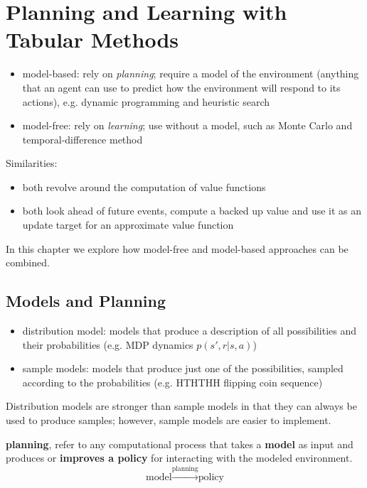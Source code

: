 \documentclass[sutton_barto_notes.tex]{subfiles}
\begin{document}
\newpage
\section{Planning and Learning with Tabular Methods}

\begin{itemize}
\item model-based: rely on \textit{planning}; require a model of the environment (anything that an agent can use to predict how the environment will respond to its actions), e.g. dynamic programming and heuristic search
\item model-free: rely on \textit{learning}; use without a model, such as Monte Carlo and temporal-difference method
\end{itemize}


Similarities:
\begin{itemize}
\item both revolve around the computation of value functions
\item both look ahead of future events, compute a backed up value and use it as an update target for an approximate value function
\end{itemize}
In this chapter we explore how model-free and model-based approaches can be combined.


\subsection{Models and Planning}

\begin{itemize}
\item distribution model: models that produce a description of all possibilities and their probabilities (e.g. MDP dynamics $p(s',r|s,a)$)
\item sample models: models that produce just one of the possibilities, sampled according to the probabilities (e.g. HTHTHH flipping coin sequence)
\end{itemize}

Distribution models are stronger than sample models in that they can always be used to produce samples; however, sample models are easier to implement.

\begin{definition}
\textbf{planning}, refer to any computational process that takes a \textbf{model} as input and produces or \textbf{improves a policy} for interacting with the modeled environment.
$$\text{model} \xrightarrow[]{\text{planning}} \text{policy} $$
\end{definition}
\end{document}
